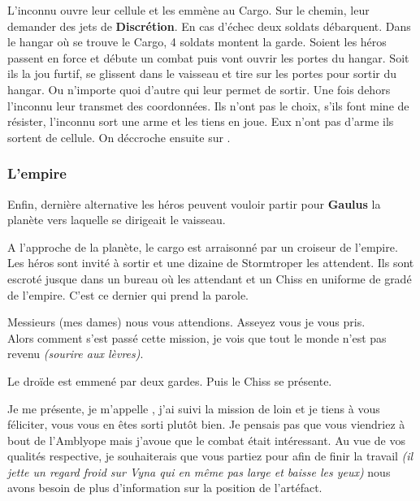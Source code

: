L'inconnu ouvre leur cellule et les emmène au Cargo. Sur le chemin, leur demander des jets de \textbf{Discrétion}. En cas d'échec deux soldats débarquent. Dans le hangar où se trouve le Cargo, 4 soldats montent la garde. Soient les héros passent en force et débute un combat puis vont ouvrir les portes du hangar. Soit ils la jou furtif, se glissent dans le vaisseau et tire sur les portes pour sortir du hangar. Ou n'importe quoi d'autre qui leur permet de sortir. Une fois dehors l'inconnu leur transmet des coordonnées. Ils n'ont pas le choix, s'ils font mine de résister, l'inconnu sort une arme et les tiens en joue. Eux n'ont pas d'arme ils sortent de cellule. On déccroche ensuite sur .



\subsubsection{L’empire} \label{sec:l-empire}
Enfin, dernière alternative les héros peuvent vouloir partir pour \textbf{Gaulus} la planète vers laquelle se dirigeait le vaisseau. 

A l'approche de la planète, le cargo est arraisonné par un croiseur de l'empire. Les héros sont invité à sortir et une dizaine de Stormtroper les attendent. Ils sont escroté jusque dans un bureau où les attendant  et un Chiss en uniforme de gradé de l'empire. C'est ce dernier qui prend la parole.

\begin{quotebox}
    Messieurs (mes dames) nous vous attendions. Asseyez vous je vous pris. \\
    Alors comment s'est passé cette mission, je vois que tout le monde n'est pas revenu \emph{(sourire aux lèvres)}. 
\end{quotebox}

Le droïde est emmené par deux gardes. Puis le Chiss se présente.

\begin{quotebox}
    Je me présente, je m'appelle , j'ai suivi la mission de loin et je tiens à vous féliciter, vous vous en êtes sorti plutôt bien. Je pensais pas que vous viendriez à bout de l'Amblyope mais j'avoue que le combat était intéressant. Au vue de vos qualités respective, je souhaiterais que vous partiez pour  afin de finir la travail \emph{(il jette un regard froid sur Vyna qui en même pas large et baisse les yeux)} nous avons besoin de plus d'information sur la position de l'artéfact.
\end{quotebox}

